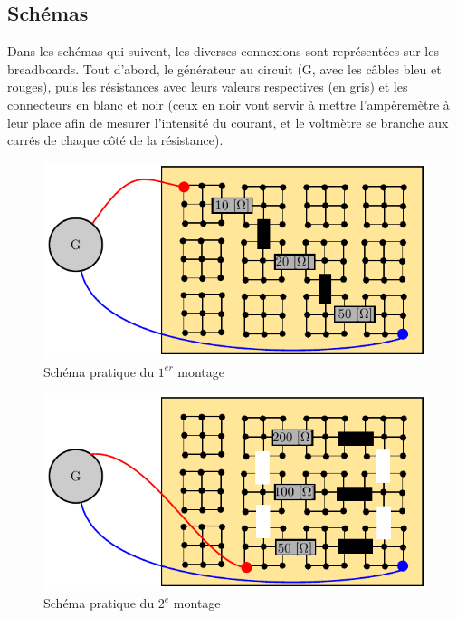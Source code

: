 \documentclass[11pt]{article}
\begin{document}
\subsection{Schémas}

Dans les schémas qui suivent,  les diverses connexions sont représentées sur les breadboards. Tout d'abord, le générateur au circuit (G, avec les câbles bleu et rouges), puis les résistances avec leurs valeurs respectives (en gris) et les connecteurs en blanc et noir (ceux en noir vont servir à mettre l’ampèremètre à leur place afin de mesurer l'intensité du courant, et le voltmètre se branche aux carrés de chaque côté de la résistance).

\begin{figure}[H]
\centering
\includegraphics[scale=1]{images/schm-pra/schm1.pdf}
\caption{Schéma pratique du $1^{er}$ montage}
\label{fig:pra-1}
\end{figure}

\begin{figure}[H]
\centering
\includegraphics[scale=1]{images/schm-pra/schm2.pdf}
\caption{Schéma pratique du $2^{e}$ montage}
\label{fig:pra-2}
\end{figure}
\end{document}
